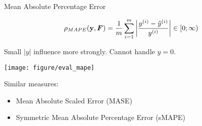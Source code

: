 \documentclass[11pt,compress,t,notes=noshow, xcolor=table]{beamer}
\begin{document}

\begin{vbframe}{Mean Absolute Percentage Error}


$$
\rho_{MAPE}(\mathbf{y}, \boldsymbol{F}) = \frac{1}{m} \sum\limits_{i=1}^m \left\rvert \frac{y^{(i)}- \hat{y}^{(i)}}{y^{(i)}} \right\rvert \in [0;\infty)
$$

\vfill

\begin{minipage}[c]{0.33\textwidth}
  \raggedright
  \small

Small $|y|$ influence more strongly. Cannot handle $y=0$.
\end{minipage}%
\begin{minipage}[c]{0.67\textwidth}
  \scriptsize
  \color{fgcolor}
  {\texttt{[image: figure/eval\_mape]}}

\end{minipage}

\vfill

\small
Similar measures:

\begin{itemize}
  \small
  \item Mean Absolute Scaled Error (MASE)
  \item Symmetric Mean Absolute Percentage Error (sMAPE)
\end{itemize}

\end{vbframe}

\end{document}
